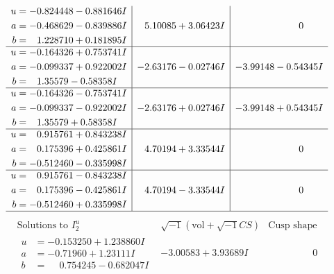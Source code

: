 \documentclass[1p]{elsarticle_modified}
\theoremstyle{definition}
\newcommand{\I}{\sqrt{-1}}
\begin{document}
$$\begin{array}{c|c|c}
\begin{aligned}
u &= -0.824448 - 0.881646 I \\
a &= -0.468629 - 0.839886 I \\
b &= \phantom{-}1.228710 + 0.181895 I\end{aligned}
 & \phantom{-}5.10085 + 3.06423 I & \phantom{-0.000000 } 0 \\ \hline\begin{aligned}
u &= -0.164326 + 0.753741 I \\
a &= -0.099337 + 0.922002 I \\
b &= \phantom{-}1.35579 - 0.58358 I\end{aligned}
 & -2.63176 - 0.02746 I & -3.99148 - 0.54345 I \\ \hline\begin{aligned}
u &= -0.164326 - 0.753741 I \\
a &= -0.099337 - 0.922002 I \\
b &= \phantom{-}1.35579 + 0.58358 I\end{aligned}
 & -2.63176 + 0.02746 I & -3.99148 + 0.54345 I \\ \hline\begin{aligned}
u &= \phantom{-}0.915761 + 0.843238 I \\
a &= \phantom{-}0.175396 + 0.425861 I \\
b &= -0.512460 - 0.335998 I\end{aligned}
 & \phantom{-}4.70194 + 3.33544 I & \phantom{-0.000000 } 0 \\ \hline\begin{aligned}
u &= \phantom{-}0.915761 - 0.843238 I \\
a &= \phantom{-}0.175396 - 0.425861 I \\
b &= -0.512460 + 0.335998 I\end{aligned}
 & \phantom{-}4.70194 - 3.33544 I & \phantom{-0.000000 } 0\\
 \hline 
 \end{array}$$\newpage$$\begin{array}{c|c|c}  
\text{Solutions to }I^u_{2}& \I (\text{vol} + \sqrt{-1}CS) & \text{Cusp shape}\\
 \hline 
\begin{aligned}
u &= -0.153250 + 1.238860 I \\
a &= -0.71960 + 1.23111 I \\
b &= \phantom{-}0.754245 - 0.682047 I\end{aligned}
 & -3.00583 + 3.93689 I & \phantom{-0.000000 } 0 \\ \hline\begin{aligned}

\end{aligned}
\end{array}$$
\end{document}
